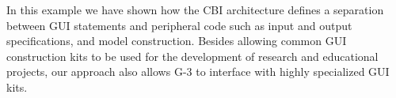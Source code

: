 \documentclass[10pt]{article}
\begin{document}








In this example we have shown how the CBI architecture defines a
separation between GUI statements and peripheral code such as input
and output specifications, and model construction.  Besides allowing
common GUI construction kits to be used for the development of
research and educational projects, our approach also allows G-3 to
interface with highly specialized GUI kits.
\end{document}

